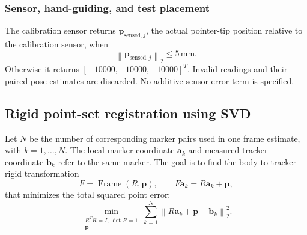 \documentclass[11pt]{article}
\newcommand{\vct}[1]{\bm{#1}}
\newcommand{\Frame}{\operatorname{Frame}}
\newcommand{\norm}[1]{\left\|#1\right\|_2}
\begin{document}
\subsubsection{Sensor, hand-guiding, and test placement}
The calibration sensor returns $\vct{p}_{\mathrm{sensed},j}$, the actual pointer-tip position relative to the calibration sensor, when
\begin{equation}
\norm{\vct{p}_{\mathrm{sensed},j}}\leq5\,\mathrm{mm}.
\end{equation}
Otherwise it returns $[-10000,-10000,-10000]^T$. Invalid readings and their paired pose estimates are discarded. No additive sensor-error term is specified.

\subsection{Rigid point-set registration using SVD}
Let $N$ be the number of corresponding marker pairs used in one frame estimate, with $k=1,\ldots,N$. The local marker coordinate $\vct{a}_k$ and measured tracker coordinate $\vct{b}_k$ refer to the same marker. The goal is to find the body-to-tracker rigid transformation
\begin{equation}
F=\Frame(R,\vct{p}),\qquad F\vct{a}_k=R\vct{a}_k+\vct{p},
\end{equation}
that minimizes the total squared point error:
\begin{equation}
\min_{\substack{R^TR=I,\ \det R=1\\\vct{p}}}
\sum_{k=1}^{N}\norm{R\vct{a}_k+\vct{p}-\vct{b}_k}^2.
\end{equation}
\end{document}

